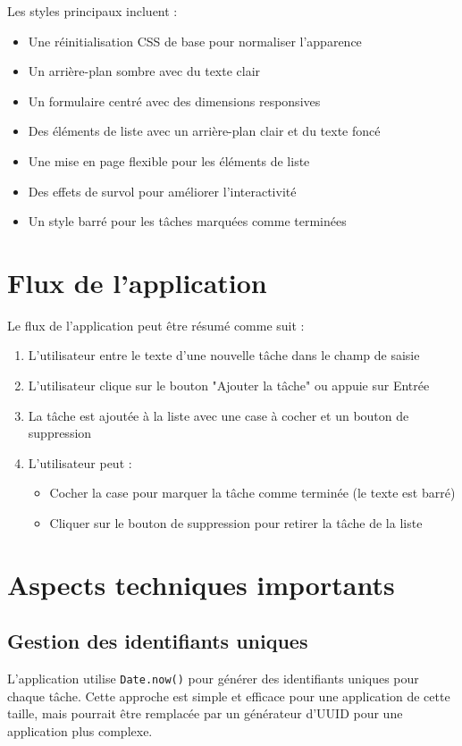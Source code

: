 \documentclass{article}
\begin{document}
Les styles principaux incluent :
\begin{itemize}
    \item Une réinitialisation CSS de base pour normaliser l'apparence
    \item Un arrière-plan sombre avec du texte clair
    \item Un formulaire centré avec des dimensions responsives
    \item Des éléments de liste avec un arrière-plan clair et du texte foncé
    \item Une mise en page flexible pour les éléments de liste
    \item Des effets de survol pour améliorer l'interactivité
    \item Un style barré pour les tâches marquées comme terminées
\end{itemize}

\section{Flux de l'application}
Le flux de l'application peut être résumé comme suit :

\begin{enumerate}
    \item L'utilisateur entre le texte d'une nouvelle tâche dans le champ de saisie
    \item L'utilisateur clique sur le bouton "Ajouter la tâche" ou appuie sur Entrée
    \item La tâche est ajoutée à la liste avec une case à cocher et un bouton de suppression
    \item L'utilisateur peut :
    \begin{itemize}
        \item Cocher la case pour marquer la tâche comme terminée (le texte est barré)
        \item Cliquer sur le bouton de suppression pour retirer la tâche de la liste
    \end{itemize}
\end{enumerate}

\section{Aspects techniques importants}

\subsection{Gestion des identifiants uniques}
L'application utilise \texttt{Date.now()} pour générer des identifiants uniques pour chaque tâche. Cette approche est simple et efficace pour une application de cette taille, mais pourrait être remplacée par un générateur d'UUID pour une application plus complexe.
\end{document}
